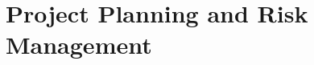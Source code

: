 \documentclass[titlepage]{article}
\begin{document}
\section{Project Planning and Risk Management}

\def \Ta {\shortstack{Existing \\ Computer Vision \\ Libraries}}
\def \TaAlt {Research Libraries}

\def \Tb {\shortstack{Learn \\ Dependent \\ APIs}}
\def \TbAlt {Learn API}

\def \Tc {\shortstack{Database \\ Design}}
\def \TcAlt {Database Design}

\def \Td {\shortstack{Software \\ Design}}
\def \TdAlt {Software Design}

\def \Te {\shortstack{Database \\ Development}}
\def \TeAlt {Database Dev.}

\def \Tf {\shortstack{Software \\ Development}}
\def \TfAlt {Software Dev.}

\def \Tg {\shortstack{Analysis \\ and \\ Testing}}
\def \TgAlt {Analysis/Testing}

\def \Th {\shortstack{User \\ Feedback}}
\def \ThAlt {User Feedback}

\def \Y {2014}
\def \Da {00/00}
\def \Db {00/00}
\def \Dc {00/00}
\def \Dd {00/00}
\def \De {00/00}
\def \Df {00/00}
\def \Dg {00/00}
\def \Dh {00/00}
\end{document}
